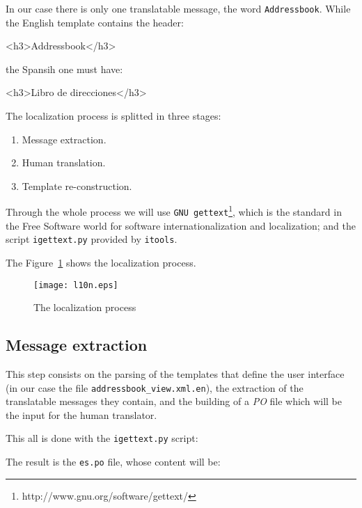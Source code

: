 In our case there is only one translatable message, the word
{\tt Addressbook}. While the English template contains the header:

\begin{code}
    <h3>Addressbook</h3>
\end{code}

the Spansih one must have:

\begin{code}
    <h3>Libro de direcciones</h3>
\end{code}

The localization process is splitted in three stages:

\begin{enumerate}
  \item Message extraction.
  \item Human translation.
  \item Template re-construction.
\end{enumerate}

Through the whole process we will use {\tt GNU
gettext}\footnote{http://www.gnu.org/software/gettext/}, which is the
standard in the Free Software world for software internationalization
and localization; and the script {\tt igettext.py} provided by {\tt itools}.

The Figure~\ref{Figure: i18n} shows the localization process.

\begin{figure}
  \center
  \texttt{[image: l10n.eps]}
  \caption{The localization process}
  \label{Figure: i18n}
\end{figure}

\subsection{Message extraction}

This step consists on the parsing of the templates that define the user
interface (in our case the file {\tt addressbook\_view.xml.en}), the
extraction of the translatable messages they contain, and the building of
a {\em PO} file which will be the input for the human translator.

This all is done with the {\tt igettext.py} script:


The result is the {\tt es.po} file, whose content will be:

